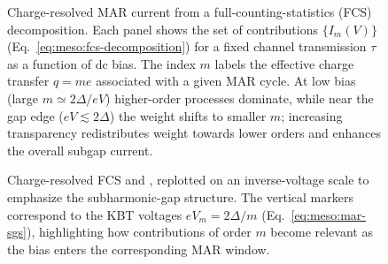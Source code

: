             \begin{figure}[t]
                \centering
                \hfill
                \hfill
                \caption{Charge-resolved MAR current from a full-counting-statistics (FCS) decomposition. Each panel shows the set of contributions $\{I_m(V)\}$ (Eq.~\eqref{eq:meso:fcs-decomposition}) for a fixed channel transmission $\tau$ as a function of dc bias. The index $m$ labels the effective charge transfer $q=me$ associated with a given MAR cycle. At low bias (large $m\simeq 2\Delta/eV$) higher-order processes dominate, while near the gap edge ($eV\lesssim 2\Delta$) the weight shifts to smaller $m$; increasing transparency redistributes weight towards lower orders and enhances the overall subgap current.}
                \label{fig:meso:fcs}
            \end{figure}

            \begin{figure}[t]
                \centering
                \hspace{.1in}
                \caption{Charge-resolved FCS  and , replotted on an inverse-voltage scale to emphasize the subharmonic-gap structure. The vertical markers correspond to the KBT voltages $eV_m=2\Delta/m$ (Eq.~\eqref{eq:meso:mar-sgs}), highlighting how contributions of order $m$ become relevant as the bias enters the corresponding MAR window.}
                \label{fig:meso:fcs-m-inv}
            \end{figure}

